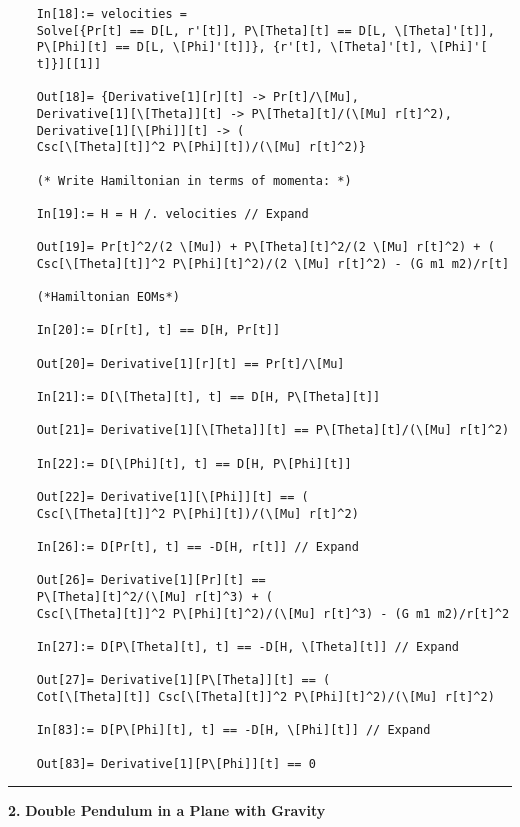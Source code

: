 \documentclass{article}
\theoremstyle{definition}
\begin{document}
\begin{enumerate}[label=(\alph*)]
\begin{lstlisting}
	In[18]:= velocities = 
	Solve[{Pr[t] == D[L, r'[t]], P\[Theta][t] == D[L, \[Theta]'[t]], 
	P\[Phi][t] == D[L, \[Phi]'[t]]}, {r'[t], \[Theta]'[t], \[Phi]'[
	t]}][[1]]
	
	Out[18]= {Derivative[1][r][t] -> Pr[t]/\[Mu], 
	Derivative[1][\[Theta]][t] -> P\[Theta][t]/(\[Mu] r[t]^2), 
	Derivative[1][\[Phi]][t] -> (
	Csc[\[Theta][t]]^2 P\[Phi][t])/(\[Mu] r[t]^2)}
	
	(* Write Hamiltonian in terms of momenta: *)
	
	In[19]:= H = H /. velocities // Expand
	
	Out[19]= Pr[t]^2/(2 \[Mu]) + P\[Theta][t]^2/(2 \[Mu] r[t]^2) + (
	Csc[\[Theta][t]]^2 P\[Phi][t]^2)/(2 \[Mu] r[t]^2) - (G m1 m2)/r[t]
	
	(*Hamiltonian EOMs*)
	
	In[20]:= D[r[t], t] == D[H, Pr[t]]
	
	Out[20]= Derivative[1][r][t] == Pr[t]/\[Mu]
	
	In[21]:= D[\[Theta][t], t] == D[H, P\[Theta][t]]
	
	Out[21]= Derivative[1][\[Theta]][t] == P\[Theta][t]/(\[Mu] r[t]^2)
	
	In[22]:= D[\[Phi][t], t] == D[H, P\[Phi][t]]
	
	Out[22]= Derivative[1][\[Phi]][t] == (
	Csc[\[Theta][t]]^2 P\[Phi][t])/(\[Mu] r[t]^2)
	
	In[26]:= D[Pr[t], t] == -D[H, r[t]] // Expand
	
	Out[26]= Derivative[1][Pr][t] == 
	P\[Theta][t]^2/(\[Mu] r[t]^3) + (
	Csc[\[Theta][t]]^2 P\[Phi][t]^2)/(\[Mu] r[t]^3) - (G m1 m2)/r[t]^2
	
	In[27]:= D[P\[Theta][t], t] == -D[H, \[Theta][t]] // Expand
	
	Out[27]= Derivative[1][P\[Theta]][t] == (
	Cot[\[Theta][t]] Csc[\[Theta][t]]^2 P\[Phi][t]^2)/(\[Mu] r[t]^2)
	
	In[83]:= D[P\[Phi][t], t] == -D[H, \[Phi][t]] // Expand
	
	Out[83]= Derivative[1][P\[Phi]][t] == 0
	\end{lstlisting}
	
\end{enumerate}




\hrule

$\,$\\


\noindent \textbf{2.} \textbf{Double Pendulum in a Plane with Gravity}
\end{document}
